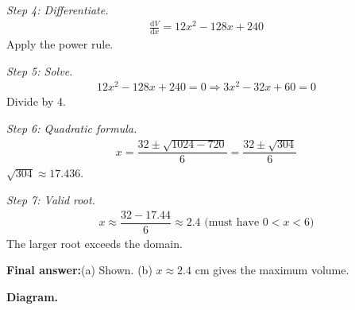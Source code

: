 \documentclass[11pt]{article}
\begin{document}
\textit{Step 4: Differentiate.}
\[\begin{gathered}
\frac{\mathrm{d}V}{\mathrm{d}x} = 12x^2 - 128x + 240
\end{gathered}\]
Apply the power rule.

\textit{Step 5: Solve.}
\[\begin{gathered}
12x^2 - 128x + 240 = 0 \Rightarrow 3x^2 - 32x + 60 = 0
\end{gathered}\]
Divide by 4.

\textit{Step 6: Quadratic formula.}
\[\begin{gathered}
x = \dfrac{32 \pm \sqrt{1024 - 720}}{6} = \dfrac{32 \pm \sqrt{304}}{6}
\end{gathered}\]
\( \sqrt{304} \approx 17.436 \).

\textit{Step 7: Valid root.}
\[\begin{gathered}
x \approx \dfrac{32 - 17.44}{6} \approx 2.4 \text{ (must have } 0 < x < 6\text{)}
\end{gathered}\]
The larger root exceeds the domain.

\begin{answerbox}
\textbf{Final answer:}\quad (a) Shown. (b) \(\displaystyle  x \approx 2.4 \) cm gives the maximum volume.
\end{answerbox}
\textbf{Diagram.}
\end{document}
